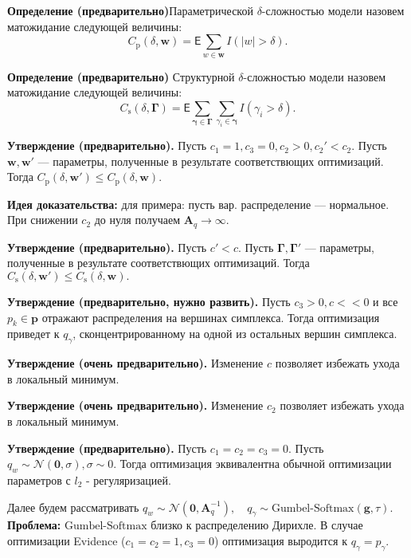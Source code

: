 \documentclass[12pt]{article}
\begin{document}
\textbf{Определение (предварительно)}Параметрической $\delta$-сложностью модели назовем матожидание следующей величины:
\[
    C_\text{p}(\delta, \mathbf{w}) = \mathsf{E}\sum_{w \in \mathbf{w}} I(|w| > \delta).
\] 

\textbf{Определение (предварительно)} Структурной $\delta$-сложностью модели назовем матожидание следующей величины:
\[
     C_\text{s}(\delta, \boldsymbol{\Gamma}) = \mathsf{E}\sum_{\boldsymbol{\gamma} \in \boldsymbol{\Gamma}}\sum_{\gamma_i \in \boldsymbol{\gamma}} I(\gamma_i > \delta). 
\]

\textbf{Утверждение (предварительно).} Пусть $c_1 = 1, c_3 = 0, c_2 > 0, c_2' < c_2$. Пусть $\mathbf{w}, \mathbf{w}'$ --- параметры, полученные в результате соответствющих оптимизаций. Тогда  $C_\text{p}(\delta, \mathbf{w}') \leq C_\text{p}(\delta, \mathbf{w}).$ 

\textbf{Идея доказательства:}  для примера: пусть вар. распределение --- нормальное. При снижении $c_2$ до нуля получаем $\mathbf{A}_q \to \infty$.

\textbf{Утверждение (предварительно).} Пусть $c' < c$. Пусть $ \boldsymbol{\Gamma},  \boldsymbol{\Gamma}'$ --- параметры, полученные в результате соответствющих оптимизаций. Тогда  $C_\text{s}(\delta, \mathbf{w}') \leq C_\text{s}(\delta, \mathbf{w}).$ 

\textbf{Утверждение (предварительно, нужно развить).} Пусть $c_3 > 0, c << 0$ и все $p_k \in \mathbf{p}$ отражают распределения на вершинах симплекса. Тогда оптимизация приведет к $q_\gamma$, сконцентрированному на одной из остальных вершин симплекса.

\textbf{Утверждение (очень предварительно).} Изменение $c$ позволяет избежать ухода в локальный минимум. 

\textbf{Утверждение (очень предварительно).} Изменение $c_2$ позволяет избежать ухода в локальный минимум.

\textbf{Утверждение (предварительно).} Пусть $c_1 = c_2 = c_3 = 0$. Пусть $q_w \sim \mathcal{N}(\mathbf{0}, \sigma), \sigma \sim 0$. 
Тогда оптимизация эквивалентна обычной оптимизации параметров с $l_2$ - регуляризацией.

Далее будем рассматривать $q_w \sim \mathcal{N}(\mathbf{0}, \mathbf{A}_q^{-1}), \quad q_\gamma \sim \text{Gumbel-Softmax}(\mathbf{g}, \tau).$
\textbf{Проблема:} $\text{Gumbel-Softmax}$ близко к распределению Дирихле. В случае оптимизации Evidence ($c_1 = c_2 = 1, c_3 = 0$) оптимизация выродится к $q_\gamma = p_\gamma$.
\end{document}
